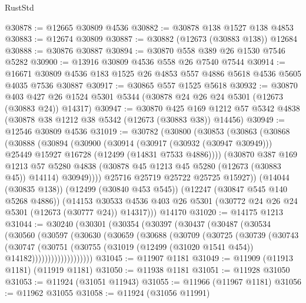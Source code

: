 \begin{lexlean}{RustStd}
\begin{coremodule}
{\begin{coremodule}
{{{{{{{{{{{{{{{{{{{{{{{{{{{{{{{{{{{{{{{{{{{{{{{{{{{{{{{{{{{{{{{{{{{{{{{{{{{{{{{{@30878 := @12665 @30809 @4536
@30882 := @30878 @138 @1527 @138 @4853
@30883 := @12674 @30809
@30887 := @30882 (@12673 (@30883 @138)) @12684
@30888 := @30876 @30887
@30894 := @30870 @558 @389 @26 @1530 @7546 @5282
@30900 := @13916 @30809 @4536 @558 @26 @7540 @7544
@30914 := @16671 @30809 @4536 @183 @1525 @26 @4853 @557 @4886 @5618 @4536 @5605 @4035 @7536 @30887
@30917 := @30865 @557 @1525 @5618
@30932 := @30870
    @403
    @427
    @26
    @1524
    @5301
    @5344
    (@30878 @24 @26 @24 @5301 (@12673 (@30883 @24)) @14317)
@30947 := @30870
    @425
    @169
    @1212
    @57
    @5342
    @4838
    (@30878 @38 @1212 @38 @5342 (@12673 (@30883 @38)) @14456)
@30949 := @12546 @30809 @4536
@31019 := @30782
    (@30800
      (@30853
        (@30863
          (@30868
            (@30888
              (@30894
                (@30900
                  (@30914
                    (@30917 (@30932 (@30947 @30949)))
                    @25449
                    @15927
                    @16728
                    (@12499 (@14831 @7533 @4886))))
                (@30870
                  @387
                  @169
                  @1213
                  @57
                  @5280
                  @4838
                  (@30878 @45 @1213 @45 @5280 (@12673 (@30883 @45)) @14114)
                  @30949))))
          @25716
          @25719
          @25722
          @25725
          @15927))
      (@14044 (@30835 @138))
      (@12499 (@30840 @453 @545))
      (@12247 (@30847 @545 @140 @5268 @4886))
      (@14153 @30533 @4536 @403 @26 @5301 (@30772 @24 @26 @24 @5301 (@12673 (@30777 @24)) @14317)))
    @14170
@31020 := @14175 @1213
@31044 := @30240
    (@30301
      (@30354
        (@30397
          (@30437
            (@30487
              (@30534
                (@30560
                  (@30597
                    (@30630
                      (@30659
                        (@30688
                          (@30709
                            (@30725
                              (@30739
                                (@30743
                                  (@30747
                                    (@30751
                                      (@30755
                                        (@31019
                                          (@12499 (@31020 @1541 @454))
                                          @14182)))))))))))))))))))
@31045 := @11907 @1181
@31049 := @11909 (@11913 @1181) (@11919 @1181)
@31050 := @11938 @1181
@31051 := @11928 @31050
@31053 := @11924 (@31051 @11943)
@31055 := @11966 (@11967 @1181)
@31056 := @11962 @31055
@31058 := @11924 (@31056 @11991)
}}}}}}}}}}}}}}}}}}}}}}}}}}}}}}}}}}}}}}}}}}}}}}}}}}}}}}}}}}}}}}}}}}}}}}}}}}}}}}}}
\end{coremodule}}
\end{coremodule}
\end{lexlean}
